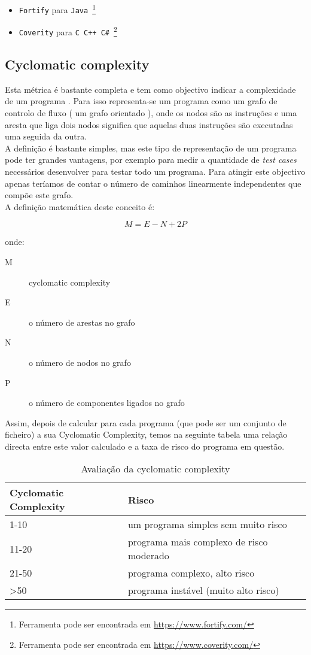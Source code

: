 \begin{itemize}
\item \texttt{Fortify} para \texttt{Java}~\footnote{Ferramenta pode ser encontrada em \url{https://www.fortify.com/}}
\item \texttt{Coverity} para \texttt{C C++ C\#}~\footnote{Ferramenta pode ser encontrada em \url{https://www.coverity.com/}} 
\end{itemize}

\subsection{Cyclomatic complexity}
Esta métrica é bastante completa e tem como objectivo indicar a complexidade de um programa \cite{DBLP:journals/tse/McCabe76}. Para isso representa-se um programa como um grafo de controlo de fluxo ( um grafo orientado ), onde os nodos são as instruções e uma aresta que liga dois nodos significa que aquelas duas instruções são executadas uma seguida da outra.\\
A definição é bastante simples, mas este tipo de representação de um programa pode ter grandes vantagens, por exemplo para medir a quantidade de \emph{test cases} necessários desenvolver para testar todo um programa\cite{Watson96specialpublication}. Para atingir este objectivo apenas teríamos de contar o número de caminhos linearmente independentes que compõe este grafo.\\

A definição matemática deste conceito é:

$$M = E - N + 2P$$

onde:

\begin{description}
\item[M] cyclomatic complexity
\item[E] o número de arestas no grafo
\item[N] o número de nodos no grafo
\item[P] o número de componentes ligados no grafo
\end{description}

Assim, depois de calcular para cada programa (que pode ser um conjunto de ficheiro) a sua Cyclomatic Complexity, temos na seguinte tabela uma relação directa
entre este valor calculado e a taxa de risco do programa em questão.

\begin{table}[htbp]
\begin{center}
\begin{tabular}{|l|l|}\hline
Cyclomatic Complexity & Risco \\\hline
1-10  & um programa simples sem muito risco\\\hline
11-20 & programa mais complexo de risco moderado\\\hline
21-50  & programa complexo, alto risco\\\hline
>50  & programa instável (muito alto risco)\\\hline
\end{tabular}
\caption{Avaliação da cyclomatic complexity}
\end{center}
\end{table}

